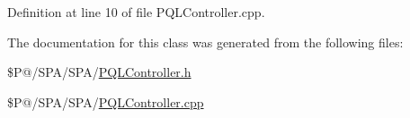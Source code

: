 Definition at line 10 of file P\-Q\-L\-Controller.\-cpp.



The documentation for this class was generated from the following files\-:\begin{DoxyCompactItemize}
\item 
\$\-P@/\-S\-P\-A/\-S\-P\-A/\hyperlink{_p_q_l_controller_8h}{P\-Q\-L\-Controller.\-h}\item 
\$\-P@/\-S\-P\-A/\-S\-P\-A/\hyperlink{_p_q_l_controller_8cpp}{P\-Q\-L\-Controller.\-cpp}\end{DoxyCompactItemize}
